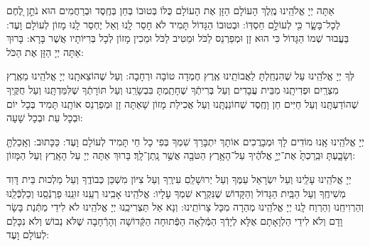 \documentclass[twoside, openany, parskip=half, 11pt]{book}
\begin{document}
\nextpage
	 אַתָּה יְיָ אֱלֹהֵֽינוּ מֶֽלֶךְ הָעוֹלָם הַזָּן אֶת הָעוֹלָם כֻּלּוֹ בְּטוּבוֹ בְּחֵן בְּחֶֽסֶד וּבְרַחֲמִים הוּא נֹתֵ֣ן לֶ֭חֶם לְכָל־בָּשָׂ֑ר כִּ֖י לְעוֹלָ֣ם חַסְדּֽוֹ: וּבְטוּבוֹ הַגָּדוֹל תָּמִיד לֹא חָסַר לָֽנוּ וְאַל יֶחְסַר לָֽנוּ מָזוֹן לְעוֹלָם וָעֶד: בַּעֲבוּר שְׁמוֹ הַגָּדוֹל כִּי הוּא זָן וּמְפַרְנֵס לַכֹּל וּמֵטִיב לַכֹּל וּמֵכִין מָזוֹן לְכָל בְּרִיּוֹתָיו אֲשֶׁר בָּרָא: בָּרוּךְ אַתָּה יְיָ הַזָּן אֶת הַכֹּל:
	

	
	 לְּךָ יְיָ אֱלֹהֵֽינוּ עַל שֶׁהִנְחַֽלְתָּ לַאֲבוֹתֵֽינוּ אֶֽרֶץ חֶמְדָה טוֹבָה וּרְחָבָה: וְעַל שֶׁהוֹצֵאתָֽנוּ יְיָ אֱלֹהֵֽינוּ מֵאֶֽרֶץ מִצְרַֽיִם וּפְדִיתָֽנוּ מִבֵּית עֲבָדִים וְעַל בְּרִיתְֿךָ שֶׁחָתַֽמְתָּ בִּבְשָׂרֵֽנוּ וְעַל תּוֹרָתְֿךָ שֶׁלִּמַּדְתָּֽנוּ וְעַל חֻקֶּֽיךָ שֶׁהוֹדַעְתָּֽנוּ וְעַל חַיִּים חֵן וָחֶֽסֶד שֶׁחוֹנַנְתָּֽנוּ וְעַל אֲכִילַת מָזוֹן שָׁאַתָּה זָן וּמְפַרְנֵס אוֹתָֽנוּ תָּמִיד בְּכָל יוֹם וּבְכָל עֵת וּבְכָל שָׁעָה:


\alhanisim

 יְיָ אֱלֹהֵֽינוּ אָֽנוּ מוֹדִים לָךְ וּמְבָרֲכִים אוֹתָךְ יִתְבָּרַךְ שִׁמְךָ בְּפִי כָל חַי תָּמִיד לְעוֹלָם וָעֶד: כַּכָּתוּב: וְאָֽכַלְתָּ֖ וְשָׂבָ֑עְתָּ וּבֵֽרַכְתָּ֙ אֶת־יְיָ֣ אֱלֹהֶ֔יךָ עַל־הָאָ֥רֶץ הַטֹּבָ֖ה אֲשֶׁ֥ר נָֽתַן־לָֽךְ׃ בָּרוּךְ אַתָּה יְיָ עַל הָאָֽרֶץ וְעַל הַמָּזוֹן:

 

 יְיָ אֱלֹהֵֽינוּ עָלֵֽינוּ וְעַל יִשְׂרָאֵל עַמֶּךָ וְעַל יְרוּשָׁלַֽםִ עִירֶֽךָ וְעַל צִיּוֹן מִשְׁכַּן כְּבוֹדֶֽךָ וְעַל מַלְכוּת בֵּית דָּוִד מְשִׁיחֶֽךָ וְעַל הַבַּֽיִת הַגָּדוֹל וְהַקָּדוֹשׁ שֶׁנִּקְרָא שִׁמְךָ עָלָיו: אֱלֹהֵֽינוּ אָבִֽינוּ רְעֵֽנוּ זוּנֵֽנוּ פַרְנְֿסֵֽנוּ וְכַלְכְּֿלֵֽנוּ וְהַרְוִיחֵֽנוּ וְהַרְוַח לָֽנוּ יְיָ אֱלֹהֵֽינוּ מְהֵרָה מִכָּל צָרוֹתֵֽינוּ: וְנָא אַל תַּצְרִיכֵֽנוּ יְיָ אֱלֹהֵֽינוּ לֹא לִידֵי מַתְּֿנַת בָּשָׂר וָדָם וְלֹא לִידֵי הַלְוָאָתָם אֶלָּא לְיָדְֿךָ הַמְּֿלֵאָה הַפְּֿתוּחָה הַקְּֿדוֹשָׁה וְהָרְֿחָבָה שֶׁלֹּא נֵבוֹשׁ וְלֹא נִכָּלֵם לְעוֹלָם וָעֶד:

\enlargethispage{\baselineskip}
\end{document}
